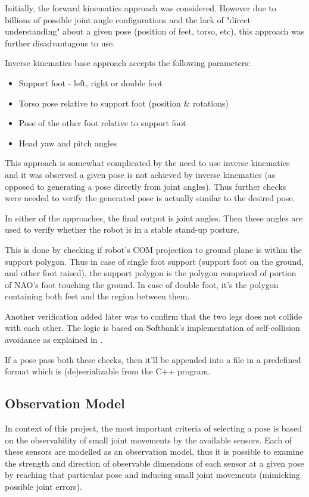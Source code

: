 \documentclass[english, printversion, nomenclature, notitle]{tuvisionthesis} %
\begin{document}
Initially, the forward kinematics approach was considered. However due to billions of possible joint angle configurations and the lack of "direct understanding" about a given pose (position of feet, torso, etc), this approach was further disadvantagous to use.

Inverse kinematics base approach accepts the following parameters:
\begin{itemize}
	\item Support foot - left, right or double foot
	\item Torso pose relative to support foot (position \& rotations)
	\item Pose of the other foot relative to support foot
	\item Head yaw and pitch angles
\end{itemize}
This approach is somewhat complicated by the need to use inverse kinematics and it was observed a given pose is not achieved by inverse kinematics (as opposed to generating a pose directly from joint angles). Thus further checks were needed to verify the generated pose is actually similar to the desired pose.

In either of the approaches, the final output is joint angles. Then these angles are used to verify whether the robot is in a stable stand-up posture.

This is done by checking if robot's COM projection to ground plane is within the support polygon. Thus in case of single foot support (support foot on the ground, and other foot raised), the support polygon is the polygon comprised of portion of NAO's foot touching the ground. In case of double foot, it's the polygon containing both feet and the region between them. 

Another verification added later was to confirm that the two legs does not collide with each other. The logic is based on Softbank's implementation of self-collision avoidance as explained in .

If a pose pass both these checks, then it'll be appended into a file in a predefined format which is (de)serializable from the C++ program. 

\subsection{Observation Model}
In context of this project, the most important criteria of selecting a pose is based on the observability of small joint movements by the available sensors. Each of these sensors are modelled as an observation model, thus it is possible to examine the strength and direction of observable dimensions of each sensor at a given pose by reaching that particular pose and inducing small joint movements (mimicking possible joint errors).
\end{document}
